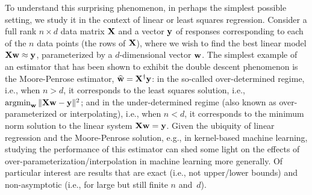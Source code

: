 \documentclass[11pt]{article}
\begin{document}
To understand this
surprising phenomenon, in perhaps the simplest possible setting, we
study it in the context of linear or least squares regression.
Consider a full rank $n\times d$ data matrix $\mathbf X$ and a vector $\mathbf y$ of
responses corresponding to each of the $n$ data points (the rows of $\mathbf X$), where we wish to
find the best linear model $\mathbf X\mathbf w\approx \mathbf y$, parameterized by a
$d$-dimensional vector $\mathbf w$.
The simplest example of an estimator that has been shown to exhibit
the double descent phenomenon \citep{belkin2019two} is the
Moore-Penrose estimator, $\widehat{\mathbf w}=\mathbf X^\dagger\mathbf y$:
in the so-called over-determined regime, i.e., when $n>d$, it corresponds to the
least squares solution, i.e., $\operatorname*{\mathop{\mathrm{argmin}}}_{\mathbf w} \|\mathbf X\mathbf w-\mathbf y\|^2$; and in the
under-determined regime (also known as
over-parameterized or interpolating), i.e., when $n<d$, it
corresponds to the minimum norm solution to the linear system $\mathbf X\mathbf w=\mathbf y$.
Given the ubiquity of linear regression and the Moore-Penrose
solution, e.g., in kernel-based machine learning, studying the
performance of this estimator can shed some light on the effects of
over-parameterization/interpolation in machine learning more generally.
Of particular interest are results that are exact (i.e., not upper/lower bounds) and
non-asymptotic (i.e., for large but still finite $n$ and~$d$).
\end{document}
